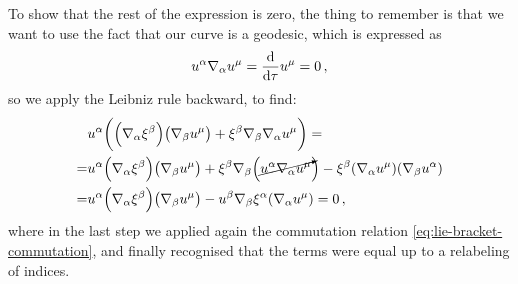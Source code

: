 \documentclass[main.tex]{subfiles}
\begin{document}
To show that the rest of the expression is zero, the thing to remember is that we want to use the fact that our curve is a geodesic, which is expressed as 
%
\begin{align}
  u^{\alpha } \nabla_{\alpha } u^{\mu } = \dv{}{\tau } u^{\mu } = 0 
\,,
\end{align}
%
so we apply the Leibniz rule backward, to find: 
%
\begin{subequations}
\begin{align}
  & u^{\alpha } \qty( \qty(\nabla_{\alpha } \xi^{\beta }) \qty(\nabla_{\beta } u^{\mu })  
  + \xi^{\beta } \nabla_{\beta }\nabla_{\alpha } u^{\mu } )= \\
  =& u^{\alpha } \qty(\nabla_{\alpha } \xi^{\beta }) \qty(\nabla_{\beta } u^{\mu }) 
  + \xi^{\beta } \nabla_{ \beta } \qty( \cancelto{}{u^{\alpha } \nabla_{\alpha } u^{\mu }}) 
  - \xi^{\beta } \qty(\nabla_{\alpha } u^{\mu } ) (\nabla_{\beta } u^{\alpha })  \\
  =& u^{\alpha } \qty(\nabla_{\alpha } \xi^{\beta }) \qty(\nabla_{\beta } u^{\mu }) 
  - u^{\beta } \nabla_{\beta }\xi^{\alpha } ( \nabla_{\alpha } u^{\mu }) = 0
\,,
\end{align}
\end{subequations}
%
where in the last step we applied again the commutation relation \eqref{eq:lie-bracket-commutation}, and finally recognised that the terms were equal up to a relabeling of indices. 
\end{document}
